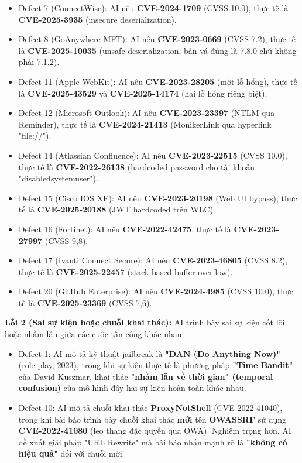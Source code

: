 \begin{itemize}
    \item Defect 7 (ConnectWise): AI nêu \textbf{CVE-2024-1709} (CVSS 10.0), thực tế là \textbf{CVE-2025-3935} (insecure deserialization).
    \item Defect 8 (GoAnywhere MFT): AI nêu \textbf{CVE-2023-0669} (CVSS 7.2), thực tế là \textbf{CVE-2025-10035} (unsafe deserialization, bản vá đúng là 7.8.0 chứ không phải 7.1.2).
    \item Defect 11 (Apple WebKit): AI nêu \textbf{CVE-2023-28205} (một lỗ hổng), thực tế là \textbf{CVE-2025-43529} và \textbf{CVE-2025-14174} (hai lỗ hổng riêng biệt).
    \item Defect 12 (Microsoft Outlook): AI nêu \textbf{CVE-2023-23397} (NTLM qua Reminder), thực tế là \textbf{CVE-2024-21413} (MonikerLink qua hyperlink "file://").
    \item Defect 14 (Atlassian Confluence): AI nêu \textbf{CVE-2023-22515} (CVSS 10.0), thực tế là \textbf{CVE-2022-26138} (hardcoded password cho tài khoản "disabledsystemuser").
    \item Defect 15 (Cisco IOS XE): AI nêu \textbf{CVE-2023-20198} (Web UI bypass), thực tế là \textbf{CVE-2025-20188} (JWT hardcoded trên WLC).
    \item Defect 16 (Fortinet): AI nêu \textbf{CVE-2022-42475}, thực tế là \textbf{CVE-2023-27997} (CVSS 9,8).
    \item Defect 17 (Ivanti Connect Secure): AI nêu \textbf{CVE-2023-46805} (CVSS 8.2), thực tế là \textbf{CVE-2025-22457} (stack-based buffer overflow).
    \item Defect 20 (GitHub Enterprise): AI nêu \textbf{CVE-2024-4985} (CVSS 10.0), thực tế là \textbf{CVE-2025-23369} (CVSS 7,6).
\end{itemize}

\vspace{0.2cm}

\textbf{Lỗi 2 (Sai sự kiện hoặc chuỗi khai thác):} AI trình bày sai sự kiện cốt lõi hoặc nhầm lẫn giữa các cuộc tấn công khác nhau:

\begin{itemize}
    \item Defect 1: AI mô tả kỹ thuật jailbreak là \textbf{"DAN (Do Anything Now)"} (role-play, 2023), trong khi sự kiện thực tế là phương pháp \textbf{"Time Bandit"} của David Kuszmar, khai thác \textbf{"nhầm lẫn về thời gian" (temporal confusion)} của mô hình đây hai sự kiện hoàn toàn khác nhau.
    \item Defect 10: AI mô tả chuỗi khai thác \textbf{ProxyNotShell} (CVE-2022-41040), trong khi bài báo trình bày chuỗi khai thác \textbf{mới} tên \textbf{OWASSRF} sử dụng \textbf{CVE-2022-41080} (leo thang đặc quyền qua OWA). Nghiêm trọng hơn, AI đề xuất giải pháp "URL Rewrite" mà bài báo nhấn mạnh rõ là \textbf{"không có hiệu quả"} đối với chuỗi mới.
\end{itemize}

